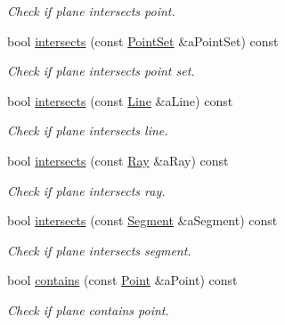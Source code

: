 \begin{DoxyCompactItemize}
\begin{DoxyCompactList}\small\item\em Check if plane intersects point. \end{DoxyCompactList}\item 
bool \hyperlink{classlibrary_1_1math_1_1geom_1_1d3_1_1objects_1_1_plane_a9e7453854756a84f931f470ddf39c4c7}{intersects} (const \hyperlink{classlibrary_1_1math_1_1geom_1_1d3_1_1objects_1_1_point_set}{Point\+Set} \&a\+Point\+Set) const
\begin{DoxyCompactList}\small\item\em Check if plane intersects point set. \end{DoxyCompactList}\item 
bool \hyperlink{classlibrary_1_1math_1_1geom_1_1d3_1_1objects_1_1_plane_a9d2b3f8758bd278430a7e818d4cd94a9}{intersects} (const \hyperlink{classlibrary_1_1math_1_1geom_1_1d3_1_1objects_1_1_line}{Line} \&a\+Line) const
\begin{DoxyCompactList}\small\item\em Check if plane intersects line. \end{DoxyCompactList}\item 
bool \hyperlink{classlibrary_1_1math_1_1geom_1_1d3_1_1objects_1_1_plane_a3420c661accd61a01ef9e22868ffcfbf}{intersects} (const \hyperlink{classlibrary_1_1math_1_1geom_1_1d3_1_1objects_1_1_ray}{Ray} \&a\+Ray) const
\begin{DoxyCompactList}\small\item\em Check if plane intersects ray. \end{DoxyCompactList}\item 
bool \hyperlink{classlibrary_1_1math_1_1geom_1_1d3_1_1objects_1_1_plane_ac957f41b0ef16fc97d927735baac5677}{intersects} (const \hyperlink{classlibrary_1_1math_1_1geom_1_1d3_1_1objects_1_1_segment}{Segment} \&a\+Segment) const
\begin{DoxyCompactList}\small\item\em Check if plane intersects segment. \end{DoxyCompactList}\item 
bool \hyperlink{classlibrary_1_1math_1_1geom_1_1d3_1_1objects_1_1_plane_a7bb2f2a298461ee30c77ad653cfd195a}{contains} (const \hyperlink{classlibrary_1_1math_1_1geom_1_1d3_1_1objects_1_1_point}{Point} \&a\+Point) const
\begin{DoxyCompactList}\small\item\em Check if plane contains point. \end{DoxyCompactList}\item 

\end{DoxyCompactItemize}
